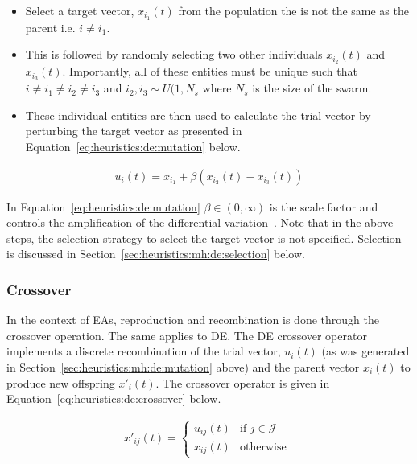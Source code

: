 \begin{itemize}
      \item Select a target vector, $x_{i_{1}}(t)$ from the population the is not the same as the parent i.e. $i \neq i_{1}$.
      \item This is followed by randomly selecting two other individuals $x_{i_{2}}(t)$ and $x_{i_{3}}(t)$. Importantly, all of these entities must be unique such that $i \neq i_{1} \neq i_{2} \neq i_{3}$ and $i_{2}, i_{3} \sim U(1, N_{s}$ where $N_{s}$ is the size of the swarm.
      \item These individual entities are then used to calculate the trial vector by perturbing the target vector as presented in Equation~\ref{eq:heuristics:de:mutation} below.
\end{itemize}


\begin{equation}
      \label{eq:heuristics:de:mutation}
      \begin{split}
            u_{i}(t) = x_{i_{1}} + \beta(x_{i_{2}}(t) - x_{i_{3}}(t))
      \end{split}
\end{equation}

In Equation~\ref{eq:heuristics:de:mutation} $\beta \in (0, \infty)$ is the scale factor and controls the amplification of the differential variation~\cite{ref:engelbrecht:2007}. Note that in the above steps, the selection strategy to select the target vector is not specified. Selection is discussed in Section~\ref{sec:heuristics:mh:de:selection} below.


\subsubsection{Crossover}
\label{sec:heuristics:mh:de:crossover}

In the context of \acp{EA}, reproduction and recombination is done through the crossover operation. The same applies to \ac{DE}. The \ac{DE} crossover operator implements a discrete recombination of the trial vector, $u_{i}(t)$ (as was generated in Section~\ref{sec:heuristics:mh:de:mutation} above) and the parent vector $x_{i}(t)$ to produce new offspring $x'_{i}(t)$. The crossover operator is given in Equation~\ref{eq:heuristics:de:crossover} below.

\begin{equation}
      \label{eq:heuristics:de:crossover}
      \begin{split}
            x'_{ij}(t)=
            \begin{cases}
                  u_{ij}(t) & \text{if } j \in \mathcal{J} \\
                  x_{ij}(t) & \text{otherwise }
            \end{cases}
      \end{split}
\end{equation}

